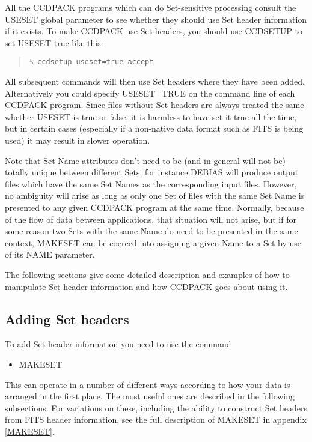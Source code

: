 \documentclass[twoside,11pt]{article}
\newcommand{\htmlref}[2]{#1}
\newcommand{\latexhtml}[2]{#1}
\newcommand{\xlabel}[1]{}
\renewcommand{\_}{\texttt{\symbol{95}}}
\newcommand{\ttsize}{\latexhtml{\small}{}}
\newenvironment{myquote}{\begin{quote}\ttsize}{\end{quote}}
\newcommand{\routine}[1]{{\sc #1}}
\newcommand{\xroutine}[1]{\htmlref{{\sc #1}}{#1}}
\begin{document}
All the CCDPACK programs which can do Set-sensitive processing
consult the USESET global parameter to see whether they should
use Set header information if it exists.
To make CCDPACK use Set headers, you should use \xroutine{CCDSETUP}
to set USESET true like this:
\begin{myquote}
\begin{verbatim}
% ccdsetup useset=true accept
\end{verbatim}
\end{myquote}
All subsequent commands will then use Set headers where they have been
added.  Alternatively you could specify USESET=TRUE on the command line
of each CCDPACK program.
Since files without Set headers are always treated the same whether 
USESET is true or false, it is harmless to have set it true all
the time, but in certain cases (especially if a non-native data
format such as FITS is being used) it may result in slower operation.

Note that Set Name attributes don't need to be (and in general will not be)
totally unique between different Sets; for instance \routine{DEBIAS}
will produce output files which have the same Set Names 
as the corresponding input files.  However, no ambiguity will arise
as long as only one Set of files with the same Set Name is presented
to any given CCDPACK program at the same time. 
Normally, because of the flow of
data between applications, that situation will not arise, 
but if for some reason two Sets with the same Name do need to be
presented in the same context, \xroutine{MAKESET} can be coerced into
assigning a given Name to a Set by use of its NAME parameter.

The following sections give some detailed description and examples of
how to manipulate Set
header information and how CCDPACK goes about using it.


\subsection{\xlabel{addsethead}\label{addsethead}Adding Set headers}

To add Set header information you need to use the command
\begin{itemize}
\item \xroutine{MAKESET}
\end{itemize}
This can operate in a number of different ways according to 
how your data is arranged in the first place.
The most useful ones are described in the following subsections.
For variations on these, including the ability to construct
Set headers from FITS header information, see the full description
of \routine{MAKESET} in appendix \ref{MAKESET}.
\end{document}
